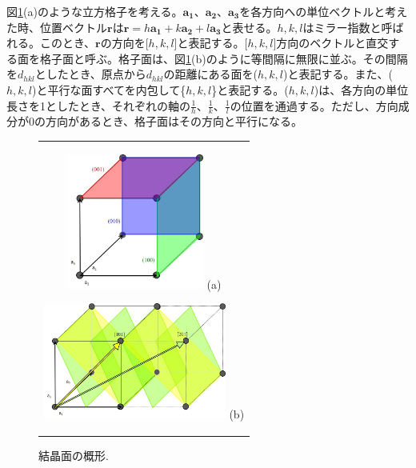 \documentclass[11pt,a4j,uplatex]{jsarticle}
\begin{document}
図\ref{a1}(a)のような立方格子を考える。$\bm{a_1}、\bm{a_2}、\bm{a_3}$を各方向への単位ベクトルと考えた時、位置ベクトル$\bm{r}$は$\bm{r}=h\bm{a_1}+k\bm{a_2}+l\bm{a_3}$と表せる。$h,k,l$はミラー指数と呼ばれる。このとき、$\bm{r}$の方向を[$h,k,l$]と表記する。[$h,k,l$]方向のベクトルと直交する面を格子面と呼ぶ。格子面は、図\ref{a1}(b)のように等間隔に無限に並ぶ。その間隔を$d_{hkl}$としたとき、原点から$d_{hkl}$の距離にある面を($h,k,l$)と表記する。また、($h,k,l$)と平行な面すべてを内包して\{$h,k,l$\}と表記する。($h,k,l$)は、各方向の単位長さを1としたとき、それぞれの軸の$\frac{1}{h}$、$\frac{1}{k}$、$\frac{1}{l}$の位置を通過する。ただし、方向成分が0の方向があるとき、格子面はその方向と平行になる。
\begin{figure}[ht]
 \centering
 \begin{tabular}{c}

  \begin{minipage}{0.5\hsize}
   \centering
   \includegraphics[clip, width=4.5cm]{a1.jpg}
   \hspace{2cm} (a)
  \end{minipage}

  \begin{minipage}{0.5\hsize}
   \centering
   \includegraphics[clip, width=6cm]{a2.jpg}
   \hspace{2cm} (b)
  \end{minipage}

 \end{tabular}
 \caption{結晶面の概形.}
 \label{a1}

\end{figure}
\end{document}

